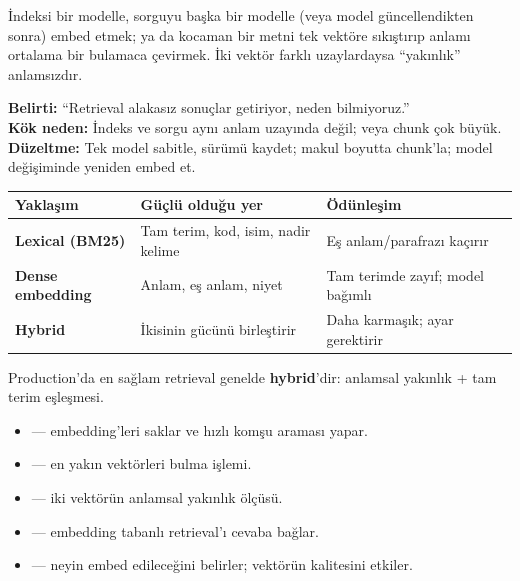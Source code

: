 \begin{antibox}
İndeksi bir modelle, sorguyu başka bir modelle (veya model güncellendikten
sonra) embed etmek; ya da kocaman bir metni tek vektöre sıkıştırıp anlamı
ortalama bir bulamaca çevirmek. İki vektör farklı uzaylardaysa ``yakınlık''
anlamsızdır.

\smallskip
\textbf{Belirti:} ``Retrieval alakasız sonuçlar getiriyor, neden bilmiyoruz.''\\
\textbf{Kök neden:} İndeks ve sorgu aynı anlam uzayında değil; veya chunk çok büyük.\\
\textbf{Düzeltme:} Tek model sabitle, sürümü kaydet; makul boyutta chunk'la; model değişiminde yeniden embed et.
\end{antibox}

\vspace{2pt}
\begin{tabularx}{\linewidth}{@{}>{\raggedright\arraybackslash}p{30mm} L L@{}}
\toprule
{\sffamily\bfseries\small Yaklaşım} &
{\sffamily\bfseries\small Güçlü olduğu yer} &
{\sffamily\bfseries\small Ödünleşim} \\
\midrule
\textbf{Lexical (BM25)} & Tam terim, kod, isim, nadir kelime &
Eş anlam/parafrazı kaçırır \\
\addlinespace[3pt]
\textbf{Dense embedding} & Anlam, eş anlam, niyet &
Tam terimde zayıf; model bağımlı \\
\addlinespace[3pt]
\textbf{Hybrid} & İkisinin gücünü birleştirir &
Daha karmaşık; ayar gerektirir \\
\bottomrule
\end{tabularx}

\vspace{4pt}
Production'da en sağlam retrieval genelde \textbf{hybrid}'dir: anlamsal yakınlık +
tam terim eşleşmesi.

\begin{itemize}
  \item {} --- embedding'leri saklar ve hızlı komşu araması yapar.
  \item {} --- en yakın vektörleri bulma işlemi.
  \item {} --- iki vektörün anlamsal yakınlık ölçüsü.
  \item {} --- embedding tabanlı retrieval'ı cevaba bağlar.
  \item {} --- neyin embed edileceğini belirler; vektörün kalitesini etkiler.
\end{itemize}

